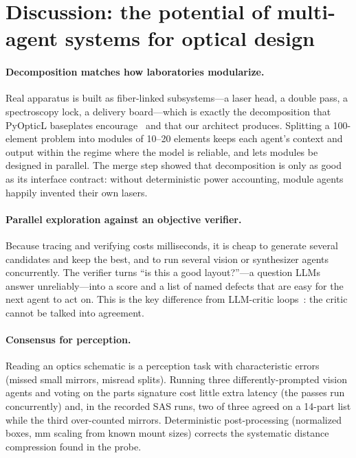 \documentclass[10pt,twocolumn,letterpaper]{article}
\begin{document}
\section{Discussion: the potential of multi-agent systems for optical design}
\label{sec:discussion}

\paragraph{Decomposition matches how laboratories modularize.} Real apparatus is built as fiber-linked subsystems---a laser head, a double pass, a spectroscopy lock, a delivery board---which is exactly the decomposition that PyOpticL baseplates encourage~\cite{pyopticl} and that our architect produces. Splitting a 100-element problem into modules of 10--20 elements keeps each agent's context and output within the regime where the model is reliable, and lets modules be designed in parallel. The merge step showed that decomposition is only as good as its interface contract: without deterministic power accounting, module agents happily invented their own lasers.

\paragraph{Parallel exploration against an objective verifier.} Because tracing and verifying costs milliseconds, it is cheap to generate several candidates and keep the best, and to run several vision or synthesizer agents concurrently. The verifier turns ``is this a good layout?''---a question LLMs answer unreliably---into a score and a list of named defects that are easy for the next agent to act on. This is the key difference from LLM-critic loops~\cite{reflexion2023,selfrefine2023}: the critic cannot be talked into agreement.

\paragraph{Consensus for perception.} Reading an optics schematic is a perception task with characteristic errors (missed small mirrors, misread splits). Running three differently-prompted vision agents and voting on the parts signature cost little extra latency (the passes run concurrently) and, in the recorded SAS runs, two of three agreed on a 14-part list while the third over-counted mirrors. Deterministic post-processing (normalized boxes, mm scaling from known mount sizes) corrects the systematic distance compression found in the probe.
\end{document}
